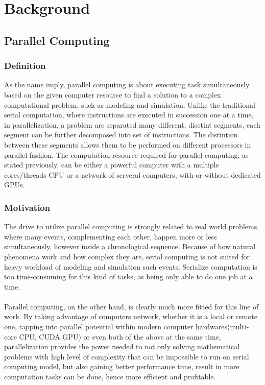 \chapter{Background}

\section{Parallel Computing}

\subsection{Definition}

As the name imply, parallel computing is about executing task simultaneously based on the given computer resource to find a solution to a complex computational problem, such as modeling and simulation. Unlike the traditional serial computation, where instructions are executed in succession one at a time, in parallelization, a problem are separated many different, disctint segments, each segment can be further decomposed into set of instructions. The distintion between these segments allows them to be performed on different processors in parallel fashion. The computation resource required for parallel computing, as stated previously, can be either a powerful computer with a multiple cores/threads CPU or a network of serveral computers, with or without dedicated GPUs. \\

\subsection{Motivation}

The drive to utilize parallel computing is strongly related to real world problems, where many events, complementing each other, happen more or less simultaneously, however inside a chronological sequence. Because of how natural phenomena work and how complex they are, serial computing is not suited for heavy workload of modeling and simulation such events. Serialize computation is too time-consuming for this kind of tasks, as being only able to do one job at a time. \\
~\\
Parallel computing, on the other hand, is clearly much more fitted for this line of work. By taking advantage of computers network, whether it is a local or remote one, tapping into parallel potential within modern computer hardwares(multi-core CPU, CUDA GPU) or even both of the above at the same time, parallelization provides the power needed to not only solving mathematical problems with high level of complexity that can be impossible to run on serial computing model, but also gaining better performance time, result in more computation tasks can be done, hence more efficient and profitable. \\


